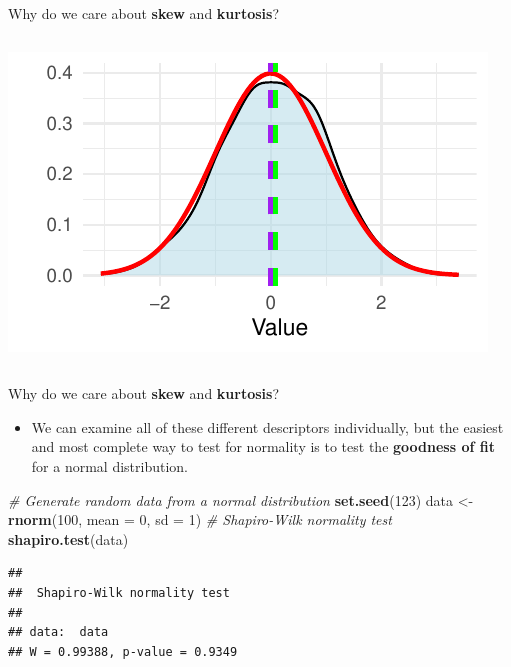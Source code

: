 \documentclass[
  ignorenonframetext,
]{beamer}
\newenvironment{Shaded}{\begin{snugshade}}{\end{snugshade}}
\newcommand{\AttributeTok}[1]{\textcolor[rgb]{0.13,0.29,0.53}{#1}}
\newcommand{\CommentTok}[1]{\textcolor[rgb]{0.56,0.35,0.01}{\textit{#1}}}
\newcommand{\DecValTok}[1]{\textcolor[rgb]{0.00,0.00,0.81}{#1}}
\newcommand{\FunctionTok}[1]{\textcolor[rgb]{0.13,0.29,0.53}{\textbf{#1}}}
\newcommand{\NormalTok}[1]{#1}
\newcommand{\OtherTok}[1]{\textcolor[rgb]{0.56,0.35,0.01}{#1}}
\providecommand{\tightlist}{%
  \setlength{\itemsep}{0pt}\setlength{\parskip}{0pt}}
\begin{document}
\begin{frame}{Why do we care about \textbf{skew} and \textbf{kurtosis}?}
\begin{columns}[T]
\begin{column}{0.48\textwidth}
\includegraphics{M4-Descriptice-Statistics_files/figure-beamer/unnamed-chunk-24-1.pdf}
\end{column}
\end{columns}
\end{frame}

\begin{frame}[fragile]{Why do we care about \textbf{skew} and
\textbf{kurtosis}?}
\label{why-do-we-care-about-skew-and-kurtosis-1}
\begin{itemize}
\tightlist
\item
  We can examine all of these different descriptors individually, but
  the easiest and most complete way to test for normality is to test the
  \textbf{goodness of fit} for a normal distribution.
\end{itemize}

\begin{Shaded}
\begin{Highlighting}[]
\CommentTok{\# Generate random data from a normal distribution}
\FunctionTok{set.seed}\NormalTok{(}\DecValTok{123}\NormalTok{)}
\NormalTok{data }\OtherTok{\textless{}{-}} \FunctionTok{rnorm}\NormalTok{(}\DecValTok{100}\NormalTok{, }\AttributeTok{mean =} \DecValTok{0}\NormalTok{, }\AttributeTok{sd =} \DecValTok{1}\NormalTok{)}
\CommentTok{\# Shapiro{-}Wilk normality test}
\FunctionTok{shapiro.test}\NormalTok{(data)}
\end{Highlighting}
\end{Shaded}

\begin{verbatim}
## 
##  Shapiro-Wilk normality test
## 
## data:  data
## W = 0.99388, p-value = 0.9349
\end{verbatim}
\end{frame}
\end{document}
